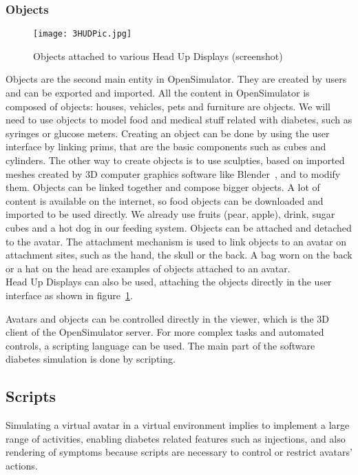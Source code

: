 \subsubsection{Objects} 

\begin{figure}[h]
  \caption{Objects attached to various Head Up Displays (screenshot)}
  \centering
  \texttt{[image: 3HUDPic.jpg]}
  \label{fig:3HUDPic}
\end{figure}

Objects are the second main entity in OpenSimulator. They are created by users and can be exported and imported. All the content in OpenSimulator is composed of objects: houses, vehicles, pets and furniture are objects. We will need to use objects to model food and medical stuff related with diabetes, such as syringes or glucose meters. Creating an object can be done by using the user interface by linking prims, that are the basic components such as cubes and cylinders. The other way to create objects is to use sculpties, based on imported meshes created by 3D computer graphics software like Blender~\cite{BlenderWebsite}, and to modify them. Objects can be linked together and compose bigger objects.
A lot of content is available on the internet, so food objects can be downloaded and imported to be used directly. We already use fruits (pear, apple), drink, sugar cubes and a hot dog in our feeding system. Objects can be attached and detached to the avatar. The attachment mechanism is used to link objects to an avatar on attachment sites, such as the hand, the skull or the back. A bag worn on the back or a hat on the head are examples of objects attached to an avatar.\\
Head Up Displays can also be used, attaching the objects directly in the user interface as shown in figure~\ref{fig:3HUDPic}.

Avatars and objects can be controlled directly in the viewer, which is the 3D client of the OpenSimulator server. For more complex tasks and automated controls, a scripting language can be used. The main part of the software diabetes simulation is done by scripting. 

\subsection{Scripts}
Simulating a virtual avatar in a virtual environment implies to implement a large range of activities, enabling diabetes related features such as injections, and also rendering of symptoms because scripts are necessary to control or restrict avatars' actions.


